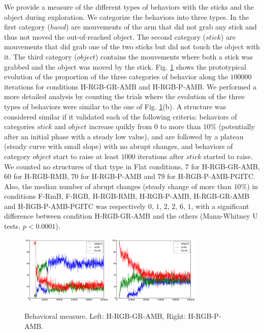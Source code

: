 \documentclass[10pt,letterpaper]{article}
\begin{document}
	We provide a measure of the different types of behaviors with the sticks and the object during exploration. 
	We categorize the behaviors into three types.
	In the first category ($hand$) are mouvements of the arm that did not grab any stick and thus not moved the out-of-reached object.
	The second category ($stick$) are mouvements that did grab one of the two sticks but did not touch the object with it.
	The third category ($object$) contains the mouvements where both a stick was grabbed and the object was moved by the stick.
	Fig. \ref{res_ow} shows the prototypical evolution of the proportion of the three categories of behavior along the $100000$ iterations for conditions H-RGB-GR-AMB and H-RGB-P-AMB.
    We performed a more detailed analysis by counting the trials where the evolution of the three types of behaviors were similar to the one of Fig. \ref{res_ow}(b).
    A structure was considered similar if it validated each of the following criteria:
    behaviors of categories $stick$ and $object$ increase quikly from $0$ to more than $10\%$ (potentially after an initial phase with a steady low value), 
    and are followed by a plateau (steady curve with small slope) with no abrupt changes, and behaviors of category $object$ start to raise at least $1000$ iterations after $stick$ started to raise.
    We counted no structures of that type in Flat conditions, $7$ for H-RGB-GR-AMB, $60$ for H-RGB-RMB, $70$ for H-RGB-P-AMB and $79$ for H-RGB-P-AMB-PGITC.
    Also, the median number of abrupt changes (steady change of more than $10\%$) in conditions F-RmB, F-RGB, H-RGB-RMB, H-RGB-P-AMB, H-RGB-GR-AMB and H-RGB-P-AMB-PGITC was respectively $0$, $1$, $2$, $2$, $6$, $1$, 
    with a significant difference between condition H-RGB-GR-AMB and the others (Mann-Whitney U tests, $p<0.0001$).


	\begin{figure}[ht]
		\centering
		\includegraphics[width=4.4cm]{./include/H-RGB-GR-AMB-log15-events-100000.pdf}
		\hspace{-0.4cm}
		\includegraphics[width=4.4cm]{./include/H-RGB-P-AMB-log8-events-100000.pdf}
		\caption{Behavioral measure. Left: H-RGB-GR-AMB, Right: H-RGB-P-AMB.}
		\label{res_ow}
	\end{figure}
	
\end{document}
